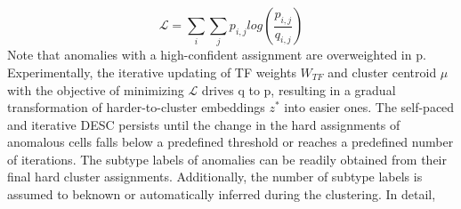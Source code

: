 \documentclass{article}
\begin{document}
\begin{equation}
    \mathcal{L}=\sum_{i}{\sum_{j} p_{i,j}log\left(\frac{p_{i,j}}{q_{i,j}}\right)}
\end{equation}
Note that anomalies with a high-confident assignment are overweighted in p. 
Experimentally, the iterative updating of TF weights $W_{TF}$ and cluster 
centroid $\mu$ with the objective of minimizing $\mathcal{L}$ drives q to p, 
resulting in a gradual transformation of harder-to-cluster embeddings 
$z^\ast$ into easier ones. The self-paced and iterative DESC persists until the 
change in the hard assignments of anomalous cells falls below a predefined threshold or 
reaches a predefined number of iterations. The subtype labels of anomalies can be readily 
obtained from their final hard cluster assignments. Additionally, the number of subtype 
labels is assumed to beknown or automatically inferred during the clustering. In detail, 
\end{document}
